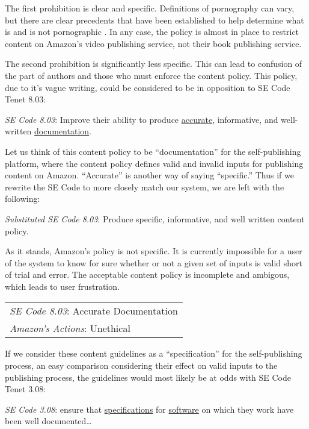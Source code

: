 \documentclass[10pt]{article}
\begin{document}
\begin{multicols}{2}
\begin{itemize}
\end{itemize}

The first prohibition is clear and specific.  Definitions of pornography can vary, but there are clear precedents that have been established to help determine what is and is not pornographic \cite{MillerVsCA}.  In any case, the policy is almost in place to restrict content on Amazon's video publishing service, not their book publishing service.  

The second prohibition is significantly less specific. This can lead to confusion of the part of authors and those who must enforce the content policy. This policy, due to it's vague writing, could be considered to be in opposition to SE Code Tenet 8.03:

\emph{SE Code 8.03}: Improve their ability to produce \underline{accurate}, informative, and well-written \underline{documentation}. 

Let us think of this content policy to be ``documentation'' for the self-publishing platform, where the content policy defines valid and invalid inputs for publishing content on Amazon.  ``Accurate'' is another way of saying ``specific.''  Thus if we rewrite the SE Code to more closely match our system, we are left with the following:

\emph{Substituted SE Code 8.03}: Produce specific, informative, and well written content policy.

As it stands, Amazon's policy is not specific.  It is currently impossible for a user of the system to know for sure whether or not a given set of inputs is valid short of trial and error.  The acceptable content policy is incomplete and ambigous, which leads to user frustration.

\begin{tabular}{| l |}
\hline
\emph{SE Code 8.03}: Accurate Documentation \\
\emph{Amazon's Actions}: Unethical \\
\hline
\end{tabular}

If we consider these content guidelines as a ``specification'' for the self-publishing process, an easy comparison considering their effect on valid inputs to the publishing process, the guidelines would most likely be at odds with SE Code Tenet 3.08:

\emph{SE Code 3.08}: ensure that \underline{specifications} for \underline{software} on which they work have been well documented\ldots 



\end{multicols}
\end{document}
